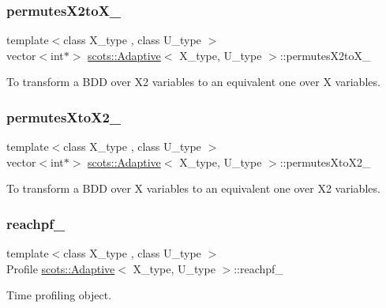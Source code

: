 \subsubsection{\texorpdfstring{permutes\+X2to\+X\+\_\+}{permutesX2toX\_}}
{\footnotesize\ttfamily template$<$class X\+\_\+type , class U\+\_\+type $>$ \\
vector$<$int$\ast$$>$ \hyperlink{classscots_1_1Adaptive}{scots\+::\+Adaptive}$<$ X\+\_\+type, U\+\_\+type $>$\+::permutes\+X2to\+X\+\_\+}

To transform a B\+DD over X2 variables to an equivalent one over X variables. \mbox{\label{classscots_1_1Adaptive_ae954d4d3177bdc4093530e254ace2b34}} 
\subsubsection{\texorpdfstring{permutes\+Xto\+X2\+\_\+}{permutesXtoX2\_}}
{\footnotesize\ttfamily template$<$class X\+\_\+type , class U\+\_\+type $>$ \\
vector$<$int$\ast$$>$ \hyperlink{classscots_1_1Adaptive}{scots\+::\+Adaptive}$<$ X\+\_\+type, U\+\_\+type $>$\+::permutes\+Xto\+X2\+\_\+}

To transform a B\+DD over X variables to an equivalent one over X2 variables. \mbox{\label{classscots_1_1Adaptive_a8c62c5ae1d50e3301098b864c5b2883f}} 
\subsubsection{\texorpdfstring{reachpf\+\_\+}{reachpf\_}}
{\footnotesize\ttfamily template$<$class X\+\_\+type , class U\+\_\+type $>$ \\
Profile \hyperlink{classscots_1_1Adaptive}{scots\+::\+Adaptive}$<$ X\+\_\+type, U\+\_\+type $>$\+::reachpf\+\_\+}

Time profiling object. \mbox{\label{classscots_1_1Adaptive_a8c2a7e89feeb75f0b51fdf9c8d1359e7}} 
